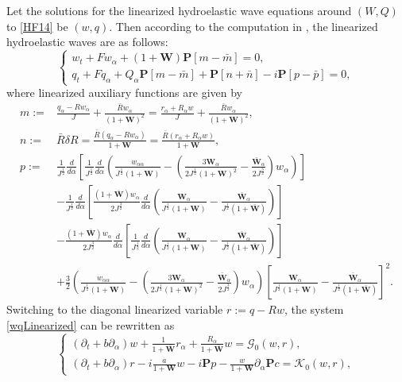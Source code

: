 \documentclass[12pt]{amsart}
\theoremstyle{remark}
\theoremstyle{definition}
\numberwithin{equation}{section}
\newcommand{\p}{\partial}
\newcommand{\al}{\alpha}
\newcommand{\f}{\frac}
\newcommand{\nP}{{\mathbf P}}
\begin{document}
Let the solutions for the linearized hydroelastic wave equations around $(W,Q)$ to \eqref{HF14} be $(w,q)$.
Then according to the computation in \cite{WanY}, the linearized hydroelastic waves are as follows:
\begin{equation} \label{wqLinearized}
\begin{cases}
w_t+Fw_{\al}+(1+\mathbf{W})\nP[m-\bar{m}]=0,\\
q_t+Fq_{\al}+Q_{\al}\nP[m-\bar{m}]+\nP[n+\bar{n}]-i\nP[p-\bar{p}]=0,
\end{cases}
\end{equation}
where linearized auxiliary functions are given by
\begin{align*}
m:=&\f{q_{\al}-Rw_{\al}}{J}+\f{\bar{R}w_{\al}}{(1+\mathbf{W})^2}=\f{r_{\al}+R_{\al}w}{J}+\f{\bar{R}w_{\al}}{(1+\mathbf{W})^2}, \\
n:=&\bar{R}\delta R=\f{\bar{R}(q_{\al}-Rw_{\al})}{1+\mathbf{W}}=\frac{\bar{R}(r_{\al}+R_{\al}w)}{1+\mathbf{W}}, \\
p:=&\f{1}{J^{\f12}}\f{d}{d\al}\left[\f{1}{J^{\f12}}\f{d}{d\al}\left(\f{w_{\al\al}}{J^{\f12}(1+\mathbf{W})}-\left(\f{3\mathbf{W}_{\al}}{2J^{\f12}(1+\mathbf{W})^2}-\f{\bar{\mathbf{W}}_{\al}}{2J^{\f32}}\right)w_{\al}\right)\right]\\
&-\f{1}{J^{\f12}}\f{d}{d\al}\left[\frac{(1+\bar{\mathbf{W}})w_{\al}}{2J^{\f32}}\f{d}{d\al}\left(\f{\mathbf{W}_{\al}}{J^{\f12}(1+\mathbf{W})}-\f{\bar{\mathbf{W}}_{\al}}{J^{\f12}(1+\bar{\mathbf{W}})}
\right)\right]\\
&-\frac{(1+\bar{\mathbf{W}})w_{\al}}{2J^{\f32}}\f{d}{d\al}\left[\f{1}{J^{\f12}}\f{d}{d\al}\left(\f{\mathbf{W}_{\al}}{J^{\f12}(1+\mathbf{W})}-\f{\bar{\mathbf{W}}_{\al}}{J^{\f12}(1+\bar{\mathbf{W}})}
\right)\right]\\
&+\f32\left(\f{w_{\al\al}}{J^{\f12}(1+\mathbf{W})}-\left(\f{3\mathbf{W}_{\al}}{2J^{\f12}(1+\mathbf{W})^2}-\f{\bar{\mathbf{W}}_{\al}}{2J^{\f32}}\right)w_{\al}\right)\left[\f{\mathbf{W}_{\al}}{J^{\f12}(1+\mathbf{W})}
-\f{\bar{\mathbf{W}}_{\al}}{J^{\f12}(1+\bar{\mathbf{W}})}\right]^2.
\end{align*}
Switching to the diagonal linearized variable $r:=q-Rw$, the system \eqref{wqLinearized} can be rewritten as
\begin{equation} \label{linearizedeqn}
\begin{cases}
(\p_t+b\p_{\al})w+\f{1}{1+\bar{\mathbf{W}}}r_{\al}+\frac{R_{\al}}{1+\bar{\mathbf{W}}}w=\mathcal{G}_0(w,r),\\
(\p_t+b\p_{\al})r-i\frac{a}{1+\mathbf{W}}w-i\nP p-\frac{w}{1+\mathbf{W}}\p_{\al}\nP c=\mathcal{K}_0(w,r),
\end{cases}
\end{equation}
\end{document}
